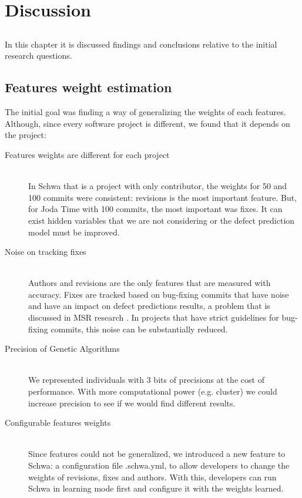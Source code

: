 \chapter{Discussion} \label{chap:discussion}

\section*{}
In this chapter it is discussed findings and conclusions relative to the initial research questions.

\section{Features weight estimation}
The initial goal was finding a way of generalizing the weights of each features. Although, since every software project is different, we found that it depends on the project:

\begin{description}
\item[Features weights are different for each project] \hfill \\
In Schwa that is a project with only contributor, the weights for 50 and 100 commits were consistent: revisions is the most important feature. But, for Joda Time with 100 commits, the most important was fixes. It can exist hidden variables that we are not considering or the defect prediction model must be improved.

\item[Noise on tracking fixes] \hfill \\
Authors and revisions are the only features that are measured with accuracy. Fixes are tracked based on bug-fixing commits that have noise and have an impact on defect predictions results, a problem that is discussed in MSR research \cite{herzig-tr-2012}. In projects that have strict guidelines for bug-fixing commits, this noise can be substantially reduced.

\item[Precision of Genetic Algorithms] \hfill \\
We represented individuals with 3 bits of precisions at the cost of performance. With more computational power (e.g. cluster) we could increase precision to see if we would find different results.

\item[Configurable features weights] \hfill \\
Since features could not be generalized, we introduced a new feature to Schwa: a configuration file .schwa.yml, to allow developers to change the weights of revisions, fixes and authors. With this, developers can run Schwa in learning mode first and configure it with the weights learned.
\end{description}

